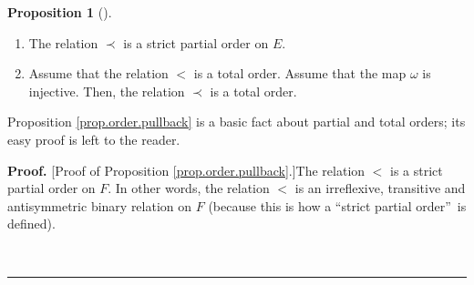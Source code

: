 \documentclass[numbers=enddot,12pt,final,onecolumn,notitlepage,abstracton]{scrartcl}
\theoremstyle{definition}
\newtheorem{prop}[theo]{Proposition}
\newenvironment{proposition}[1][]
{\begin{prop}[#1]\begin{leftbar}}
{\end{leftbar}\end{prop}}
\newenvironment{proof}[1][Proof]{\noindent\textbf{#1.} }{\ \rule{0.5em}{0.5em}}
\newenvironment{verlong}{}{}
\newenvironment{noncompile}{}{}
\begin{document}
\begin{verlong}
\begin{footnotesize}
\begin{proposition}
\begin{enumerate}
\item[(a)] The relation $\prec$ is a strict partial order on $E$.

\item[(b)] Assume that the relation $<$ is a total order. Assume that the map
$\omega$ is injective. Then, the relation $\prec$ is a total order.
\end{enumerate}
\end{proposition}

Proposition \ref{prop.order.pullback} is a basic fact about partial and total
orders; its easy proof is left to the reader.

\begin{noncompile}


\begin{proof}
[Proof of Proposition \ref{prop.order.pullback}.]The relation $<$ is a strict
partial order on $F$. In other words, the relation $<$ is an irreflexive,
transitive and antisymmetric binary relation on $F$ (because this is how a
\textquotedblleft strict partial order\textquotedblright\ is defined).


\end{proof}
\end{noncompile}
\end{footnotesize}
\end{verlong}
\end{document}
